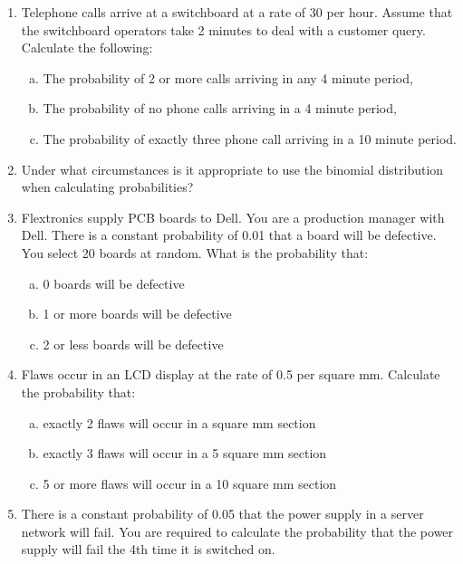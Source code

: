 \documentclass[a4paper,12pt]{article}
\begin{document}
\begin{enumerate}
    
\item 
Telephone calls arrive at a switchboard at a rate of 30 per hour.  Assume that the switchboard operators take 2 minutes to deal with a customer query. Calculate the following:

\begin{enumerate}[(a)]
\item The probability of 2 or more calls arriving in any 4 minute period,
\item  The probability of no phone calls arriving in a 4 minute period,
\item  The probability of exactly three phone call arriving in a 10 minute period.
\end{enumerate}



\item Under what circumstances is it appropriate to use the binomial distribution when calculating probabilities?				

\item 	Flextronics supply PCB boards to Dell.  You are a production manager with Dell.  There is a constant probability of 0.01 that a board will be defective.  You select 20 boards at random.  What is the probability that:

\begin{enumerate}[(a)]
\item 	0 boards will be defective
\item	1 or more boards will be defective
\item	2 or less boards will be defective			
\end{enumerate}

\item Flaws occur in an LCD display at the rate of 0.5 per square mm.  Calculate the probability that:
\begin{enumerate}[(a)]
\item exactly 2 flaws will occur in a square mm section
\item exactly 3 flaws will occur in a 5 square mm section
\item 5 or more flaws will occur in a 10 square mm section
\end{enumerate}
\item There is a constant probability of 0.05 that the power supply in a server network will fail.  You are required to calculate the probability that the power supply will fail the 4th time it is switched on.

\end{enumerate}
\end{document}
